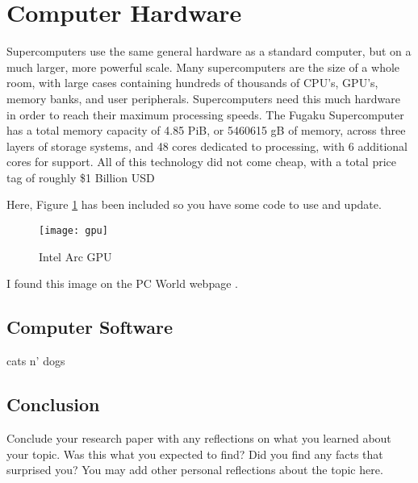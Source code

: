 \documentclass[11pt, twocolumn]{article}
\begin{document}
\section{Computer Hardware}
Supercomputers use the same general hardware as a standard computer, but on a much larger, more powerful scale. Many supercomputers are the size of a whole room, with large cases containing hundreds of thousands of CPU's, GPU's, memory banks, and user peripherals. Supercomputers need this much hardware in order to reach their maximum processing speeds. The Fugaku Supercomputer has a total memory capacity of 4.85 PiB, or 5460615 gB of memory, across three layers of storage systems, and 48 cores dedicated to processing, with 6 additional cores for support. All of this technology did not come cheap, with a total price tag of roughly \$1 Billion USD 

Here, Figure \ref{fig:gpu} has been included so you have some code to use and update.
\begin{figure}
    \centering
    \texttt{[image: gpu]}
    \caption{Intel Arc GPU}
    \label{fig:gpu}
\end{figure}

I found this image on the PC World webpage \cite{Ung21}. 

\subsection{Computer Software}
cats n' dogs

\subsection{Conclusion}
Conclude your research paper with any reflections on what you learned about your 
topic. Was this what you expected to find? Did you find any facts that surprised you?
You may add other personal reflections about the topic here.



\end{document}

